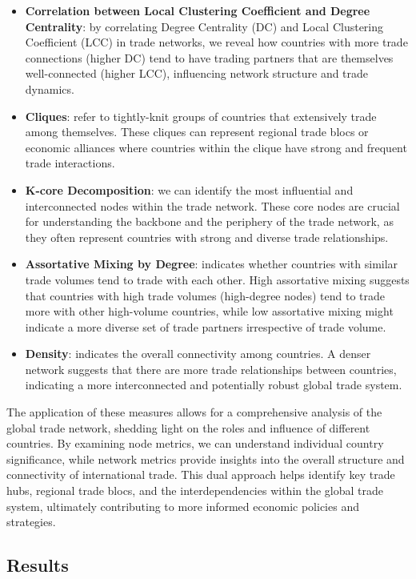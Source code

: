 \documentclass[12pt, a4paper]{article}
\begin{document}
\begin{itemize}
\begin{itemize}
        \item \textbf{Correlation between Local Clustering Coefficient and Degree Centrality}: by correlating Degree Centrality (DC) and Local Clustering Coefficient (LCC) in trade networks, we reveal how countries with more trade connections (higher DC) tend to have trading partners that are themselves well-connected (higher LCC), influencing network structure and trade dynamics.
     \item \textbf{Cliques}: refer to tightly-knit groups of countries that extensively trade among themselves. These cliques can represent regional trade blocs or economic alliances where countries within the clique have strong and frequent trade interactions.
     \item \textbf{K-core Decomposition}: we can identify the most influential and interconnected nodes within the trade network. These core nodes are crucial for understanding the backbone and the periphery of the trade network, as they often represent countries with strong and diverse trade relationships.
    \item \textbf{Assortative Mixing by Degree}:  indicates whether countries with similar trade volumes tend to trade with each other. High assortative mixing suggests that countries with high trade volumes (high-degree nodes) tend to trade more with other high-volume countries, while low assortative mixing might indicate a more diverse set of trade partners irrespective of trade volume.
    \item \textbf{Density}:  indicates the overall connectivity among countries. A denser network suggests that there are more trade relationships between countries, indicating a more interconnected and potentially robust global trade system.

\end{itemize}
\end{itemize}
The application of these measures allows for a comprehensive analysis of the global trade network, shedding light on the roles and influence of different countries. By examining node metrics, we can understand individual country significance, while network metrics provide insights into the overall structure and connectivity of international trade. This dual approach helps identify key trade hubs, regional trade blocs, and the interdependencies within the global trade system, ultimately contributing to more informed economic policies and strategies.
\subsection{Results}
\end{document}
